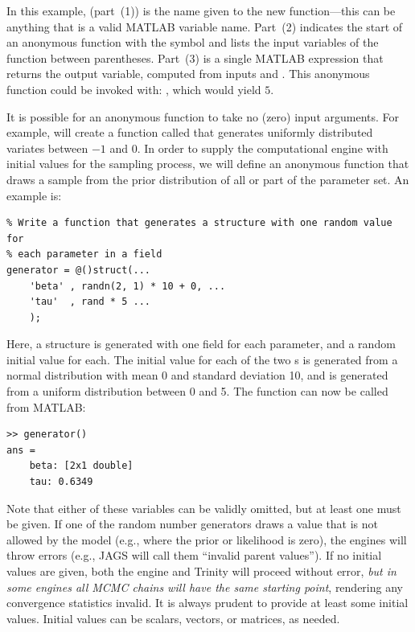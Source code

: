 \begin{center}
\end{center}
\noindent In this example,  (part~(1)) is the name given to the new function---this can be anything that is a valid MATLAB variable name. Part~{(2)} indicates the start of an anonymous function with the  symbol and lists the input variables of the function between parentheses. Part~{(3)} is a single MATLAB expression that returns the output variable, computed from inputs  and . This anonymous function could be invoked with: , which would yield $5$.

It is possible for an anonymous function to take no (zero) input arguments. For example,  will create a function called  that generates uniformly distributed variates between $-1$ and $0$. In order to supply the computational engine with initial values for the sampling process, we will define an anonymous function that draws a sample from the prior distribution of all or part of the parameter set. An example is:

\begin{lstlisting}
% Write a function that generates a structure with one random value for
% each parameter in a field
generator = @()struct(... 
    'beta' , randn(2, 1) * 10 + 0, ...
    'tau'  , rand * 5 ...
    );
\end{lstlisting}
\noindent Here, a structure is generated with one field for each parameter, and a random initial value for each. The initial value for each of the two s is generated from a normal distribution with mean 0 and standard deviation 10, and  is generated from a uniform distribution between 0 and 5. The function  can now be called from MATLAB:

\begin{lstlisting}
>> generator()
ans = 
    beta: [2x1 double]
    tau: 0.6349
\end{lstlisting}
\noindent Note that either of these variables can be validly omitted, but at least one must be given. If one of the random number generators draws a value that is not allowed by the model (e.g., where the prior or likelihood is zero), the engines will throw errors (e.g., JAGS will call them ``invalid parent values''). If no initial values are given, both the engine and Trinity will proceed without error, \emph{but in some engines all MCMC chains will have the same starting point}, rendering any convergence statistics invalid. It is always prudent to provide at least some initial values. Initial values can be scalars, vectors, or matrices, as needed.

